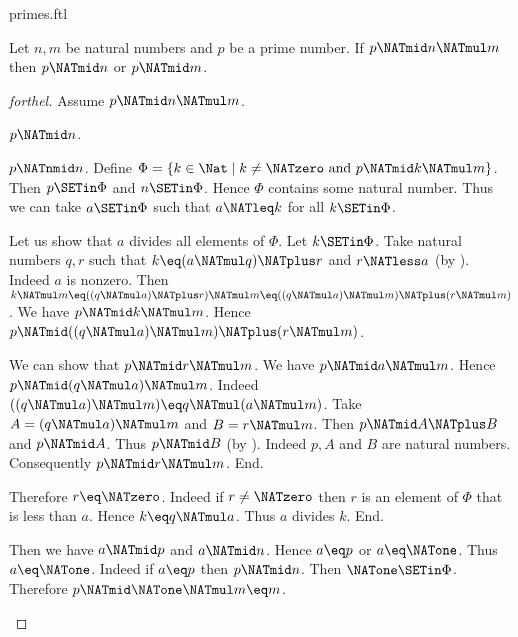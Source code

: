 \documentclass{stex}
\begin{document}
\begin{smodule}{primes.ftl}
\begin{proposition}[forthel,id=ARITHMETIC_10_8313676557713408]
  Let $n, m$ be natural numbers and $p$ be a prime number.
  If $p \NATmid n \NATmul m$ then $p \NATmid n$ or $p \NATmid m$.
\end{proposition}
\begin{proof}[forthel]
  Assume $p \NATmid n \NATmul m$.

  \begin{case}{$p \NATmid n$.} \end{case}

  \begin{case}{$p \NATnmid n$.}
    Define $\Phi = \{ k \in \Nat \mid k \neq \NATzero\text{ and }p \NATmid k \NATmul m \}$.
    Then $p \SETin \Phi$ and $n \SETin \Phi$.
    Hence $\Phi$ contains some natural number.
    Thus we can take $a \SETin \Phi$ such that $a \NATleq k$ for all $k \SETin \Phi$.

    Let us show that $a$ divides all elements of $\Phi$.
      Let $k \SETin \Phi$.
      Take natural numbers $q, r$ such that $k \eq (a \NATmul q) \NATplus r$ and $r \NATless a$ (by ).
      Indeed $a$ is nonzero.
      Then $k \NATmul m
        \eq ((q \NATmul a) \NATplus r) \NATmul m
        \eq ((q \NATmul a) \NATmul m) \NATplus (r \NATmul m)$.
      We have $p \NATmid k \NATmul m$.
      Hence $p \NATmid ((q \NATmul a) \NATmul m) \NATplus (r \NATmul m)$.

      We can show that $p \NATmid r \NATmul m$.
        We have $p \NATmid a \NATmul m$.
        Hence $p \NATmid (q \NATmul a) \NATmul m$.
        Indeed $((q \NATmul a) \NATmul m) \eq q \NATmul (a \NATmul m)$. %
        Take $A = (q \NATmul a) \NATmul m$ and $B = r \NATmul m$. %
        Then $p \NATmid A \NATplus B$ and $p \NATmid A$.
        Thus $p \NATmid B$ (by ).
        Indeed $p, A$ and $B$ are natural numbers.
        Consequently $p \NATmid r \NATmul m$.
      End.

      Therefore $r \eq \NATzero$.
      Indeed if $r \neq \NATzero$ then $r$ is an element of $\Phi$ that is less than $a$.
      Hence $k \eq q \NATmul a$.
      Thus $a$ divides $k$.
    End.

    Then we have $a \NATmid p$ and $a \NATmid n$.
    Hence $a \eq p$ or $a \eq \NATone$.
    Thus $a \eq \NATone$.
    Indeed if $a \eq p$ then $p \NATmid n$.
    Then $\NATone \SETin \Phi$.
    Therefore $p \NATmid \NATone \NATmul m \eq m$.
  \end{case}
\end{proof}
\end{smodule}
\end{document}
